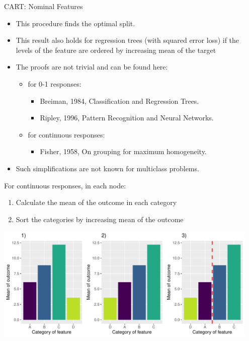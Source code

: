 \documentclass[11pt,compress,t,notes=noshow, xcolor=table]{beamer}
\newenvironment{knitrout}{}{} %
\begin{document}
\begin{vbframe}{CART: Nominal Features}
\pagebreak

  \begin{itemize}
  \item This procedure finds the optimal split.
  \item This result also holds for regression trees (with squared error loss) if the levels of the feature are ordered by increasing mean of the target
  \item The proofs are not trivial and can be found here:
    \begin{itemize}
    \item for 0-1 responses:
      \begin{itemize}
      \item Breiman, 1984, Classification and Regression Trees.
      \item Ripley, 1996, Pattern Recognition and Neural Networks.
      \end{itemize}
    \item for continuous responses:
      \begin{itemize}
      \item Fisher, 1958, On grouping for maximum homogeneity.
      \end{itemize}
    \end{itemize}
  \item Such simplifications are not known for multiclass problems.
  \end{itemize}

\pagebreak

For continuous responses, in each node:
  \begin{enumerate}
  \item Calculate the mean of the outcome in each category
  \item Sort the categories by increasing mean of the outcome
  \end{enumerate}

\vspace{0.3cm}

\begin{knitrout}\scriptsize
{}\color{fgcolor}

{\centering \includegraphics[width=0.95\textwidth]{figure/cart_splitcomp_4} 

}



\end{knitrout}
\end{vbframe}
\end{document}
